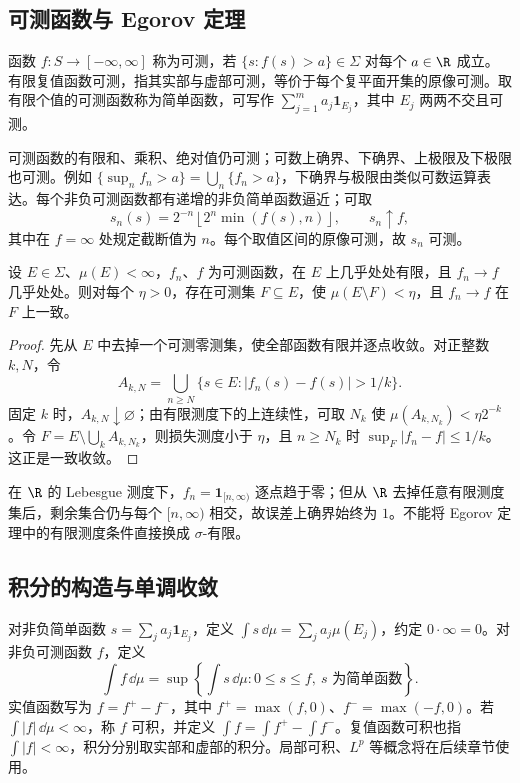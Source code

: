 \subsection{可测函数与 Egorov 定理}
\begin{definition}[可测函数与简单函数]\label{def:y0-measurable-function}
函数 $f:S\to[-\infty,\infty]$ 称为可测，若 $\{s:f(s)>a\}\in\Sigma$ 对每个 $a\in\R$ 成立。有限复值函数可测，指其实部与虚部可测，等价于每个复平面开集的原像可测。取有限个值的可测函数称为简单函数，可写作 $\sum_{j=1}^ma_j\mathbf1_{E_j}$，其中 $E_j$ 两两不交且可测。
\end{definition}

可测函数的有限和、乘积、绝对值仍可测；可数上确界、下确界、上极限及下极限也可测。例如 $\{\sup_nf_n>a\}=\bigcup_n\{f_n>a\}$，下确界与极限由类似可数运算表达。每个非负可测函数都有递增的非负简单函数逼近；可取
\[
 s_n(s)=2^{-n}\left\lfloor2^n\min(f(s),n)\right\rfloor,
 \qquad s_n\uparrow f,
\]
其中在 $f=\infty$ 处规定截断值为 $n$。每个取值区间的原像可测，故 $s_n$ 可测。

\begin{theorem}[Egorov 定理]\label{thm:y0-egorov}
设 $E\in\Sigma$、$\mu(E)<\infty$，$f_n$、$f$ 为可测函数，在 $E$ 上几乎处处有限，且 $f_n\to f$ 几乎处处。则对每个 $\eta>0$，存在可测集 $F\subseteq E$，使 $\mu(E\setminus F)<\eta$，且 $f_n\to f$ 在 $F$ 上一致。
\end{theorem}
\begin{proof}
先从 $E$ 中去掉一个可测零测集，使全部函数有限并逐点收敛。对正整数 $k,N$，令
\[
 A_{k,N}=\bigcup_{n\ge N}\{s\in E:|f_n(s)-f(s)|>1/k\}.
\]
固定 $k$ 时，$A_{k,N}\downarrow\varnothing$；由有限测度下的上连续性，可取 $N_k$ 使 $\mu(A_{k,N_k})<\eta2^{-k}$。令 $F=E\setminus\bigcup_kA_{k,N_k}$，则损失测度小于 $\eta$，且 $n\ge N_k$ 时 $\sup_F|f_n-f|\le1/k$。这正是一致收敛。
\end{proof}

\begin{example}[有限测度条件的作用]
在 $\R$ 的 Lebesgue 测度下，$f_n=\mathbf1_{[n,\infty)}$ 逐点趋于零；但从 $\R$ 去掉任意有限测度集后，剩余集合仍与每个 $[n,\infty)$ 相交，故误差上确界始终为 $1$。不能将 Egorov 定理中的有限测度条件直接换成 $\sigma$-有限。
\end{example}

\subsection{积分的构造与单调收敛}
\begin{definition}[Lebesgue 积分]\label{def:y0-integral}
对非负简单函数 $s=\sum_ja_j\mathbf1_{E_j}$，定义 $\int s\,\dd\mu=\sum_ja_j\mu(E_j)$，约定 $0\cdot\infty=0$。对非负可测函数 $f$，定义
\[
 \int f\,\dd\mu=\sup\left\{\int s\,\dd\mu:
                      0\le s\le f,\ s\text{ 为简单函数}\right\}.
\]
实值函数写为 $f=f^+-f^-$，其中 $f^+=\max(f,0)$、$f^-=\max(-f,0)$。若 $\int|f|\,\dd\mu<\infty$，称 $f$ 可积，并定义 $\int f=\int f^+-\int f^-$。复值函数可积也指 $\int|f|<\infty$，积分分别取实部和虚部的积分。局部可积、$L^p$ 等概念将在后续章节使用。
\end{definition}


